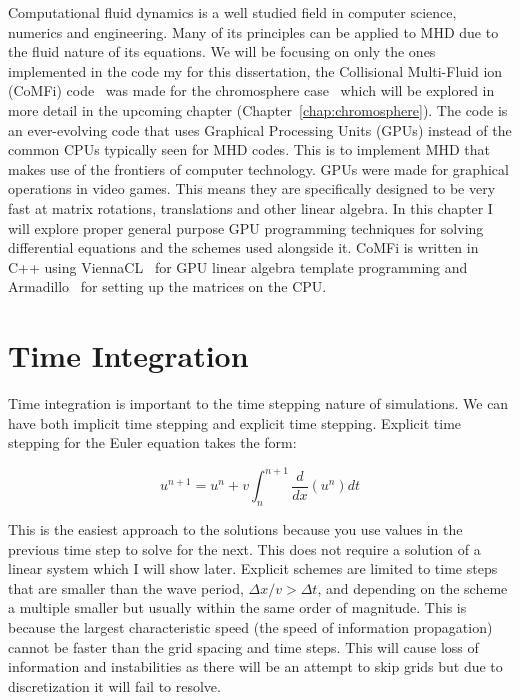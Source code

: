 \documentclass[12pt,upcase]{umlthesis}
\begin{document}
Computational fluid dynamics is a well studied field in computer science, numerics and engineering. Many of its principles can be applied to MHD due to the fluid nature of its equations. We will be focusing on only the ones implemented in the code my for this dissertation, the Collisional Multi-Fluid ion (CoMFi) code~\citep{alshidi2019} was made for the chromosphere case~\citep{alshidi2019chromo} which will be explored in more detail in the upcoming chapter (Chapter~\ref{chap:chromosphere}). The code is an ever-evolving code that uses Graphical Processing Units (GPUs) instead of the common CPUs typically seen for MHD codes. This is to implement MHD that makes use of the frontiers of computer technology. GPUs were made for graphical operations in video games. This means they are specifically designed to be very fast at matrix rotations, translations and other linear algebra. In this chapter I will explore proper general purpose GPU programming techniques for solving differential equations and the schemes used alongside it. CoMFi is written in C++ using ViennaCL~\citep{viennacl} for GPU linear algebra template programming and Armadillo~\citep{arma} for setting up the matrices on the CPU\@.

\section{Time Integration}\label{sec:timeintegration}

Time integration is important to the time stepping nature of simulations. We can have both implicit time stepping and explicit time stepping. Explicit time stepping for the Euler equation takes the form:

\begin{equation}\label{eq:explicit}
	u^{n+1} = u^n + v\int^{n+1}_n \frac{d}{dx}(u^{n}) dt
\end{equation}

This is the easiest approach to the solutions because you use values in the previous time step to solve for the next. This does not require a solution of a linear system which I will show later. Explicit schemes are limited to time steps that are smaller than the wave period, $\Delta x / v > \Delta t$, and depending on the scheme a multiple smaller but usually within the same order of magnitude. This is because the largest characteristic speed (the speed of information propagation) cannot be faster than the grid spacing and time steps. This will cause loss of information and instabilities as there will be an attempt to skip grids but due to discretization it will fail to resolve.
\end{document}

